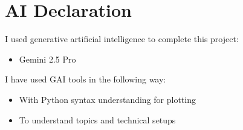 \documentclass[12pt,a4paper]{article}
\begin{document}
\newpage
\section{AI Declaration}
I used generative artificial intelligence to complete this project:
\begin{itemize}
    \item Gemini 2.5 Pro
\end{itemize}
I have used GAI tools in the following way:
\begin{itemize}
    \item With Python syntax understanding for plotting
    \item To understand topics and technical setups
\end{itemize}
\end{document}
